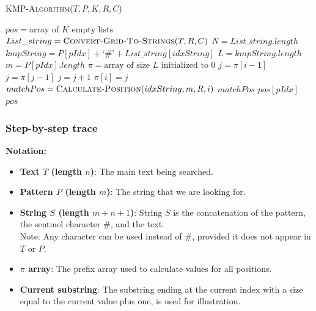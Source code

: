             \textsc{KMP-Algorithm}($T, P, K, R, C$)
            \begin{algorithmic}[1]
            \State $pos = \text{array of } K \text{ empty lists}$
            \State $List\_string = \textsc{Convert-Grid-To-Strings}(T, R, C)$
            \State $N = List\_string.length$
            \Statex
                    \State $kmpString = P[pIdx] + \text{`\#'} + List\_string[idxString]$
                    \State $L = kmpString.length$
                    \State $m = P[pIdx].length$
                    \State $\pi = \text{array of size } L \text{ initialized to 0}$
                    \Statex
                        \State $j = \pi[i - 1]$
                            \State $j = \pi[j - 1]$
                        \EndWhile
                            \State $j = j + 1$
                        \EndIf
                        \State $\pi[i] = j$
                        \Statex
                            \State $matchPos = \textsc{Calculate-Position}(idxString, m, R, i)$
                            \State {} $matchPos$  $pos[pIdx]$
                        \EndIf
                    \EndFor
                \EndFor
            \EndFor
            \State \Return $pos$
            \end{algorithmic}
    
    \subsubsection{Step-by-step trace}
    \indent \textbf{Notation:}
        \begin{itemize}
            \item \textbf{Text $T$ (length $n$)}: The main text being searched.
            \item \textbf{Pattern $P$ (length $m$)}: The string that we are looking for.
            \item \textbf{String $S$ (length $m + n + 1$)}: String $S$ is the concatenation of the pattern, the sentinel character $\#$, and the text.\\
            Note: Any character can be used instead of $\#$, provided it does not appear in $T$ or $P$.
            \item \textbf{$\pi$ array}: The prefix array used to calculate values for all positions.
            \item \textbf{Current substring}: The substring ending at the current index with a size equal to the current value plus one, is used for illustration.
        \end{itemize}

